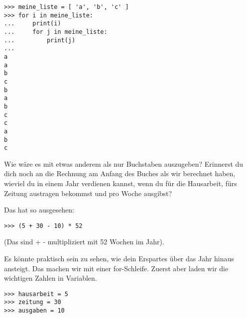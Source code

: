 \begin{listing}
\begin{verbatim}
>>> meine_liste = [ 'a', 'b', 'c' ]
>>> for i in meine_liste:
...     print(i)
...     for j in meine_liste:
...         print(j)
... 
a
a
b
c
b
a
b
c
c
a
b
c
\end{verbatim}
\end{listing}


Wie wäre es mit etwas anderem als nur Buchstaben auszugeben? Erinnerst du dich noch an die Rechnung am Anfang des Buches als wir berechnet haben, wieviel du in einem Jahr verdienen kannst, wenn du  für die Hausarbeit,  fürs Zeitung austragen bekommst und  pro Woche ausgibst?
\par
\noindent
Das hat so ausgesehen:

\begin{listing}
\begin{verbatim}
>>> (5 + 30 - 10) * 52
\end{verbatim}
\end{listing}

\noindent
(Das sind  +  -  multipliziert mit 52 Wochen im Jahr).

Es könnte praktisch sein zu sehen, wie dein Erspartes über das Jahr hinaus ansteigt. Das machen wir mit einer for-Schleife. Zuerst aber laden wir die wichtigen Zahlen in Variablen.

\begin{listing}
\begin{verbatim}
>>> hausarbeit = 5
>>> zeitung = 30
>>> ausgaben = 10
\end{verbatim}
\end{listing}

